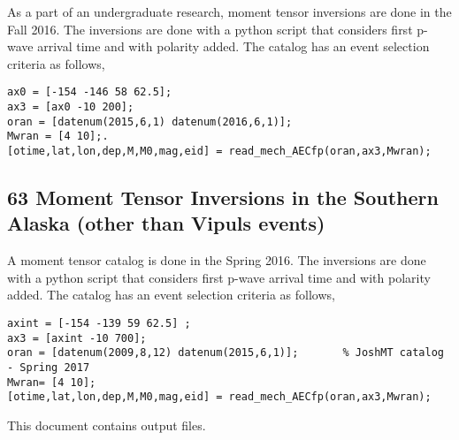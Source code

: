 \documentclass[11pt,titlepage,fleqn]{article}
\begin{document}
As a part of an undergraduate research, moment tensor inversions are done in the Fall 2016. The inversions are done with a python script that considers first p-wave arrival time and with polarity added. The catalog has an event selection criteria as follows,  
\begin{verbatim}
ax0 = [-154 -146 58 62.5];   
ax3 = [ax0 -10 200];   
oran = [datenum(2015,6,1) datenum(2016,6,1)];  
Mwran = [4 10];.
[otime,lat,lon,dep,M,M0,mag,eid] = read_mech_AECfp(oran,ax3,Mwran);
\end{verbatim}

\vspace{5mm} %

\subsection*{63  Moment Tensor Inversions in the Southern Alaska (other than Vipuls events)}
A moment tensor catalog is done in the Spring 2016. The inversions are done with a python script that considers first p-wave arrival time and with polarity added. The catalog has an event selection criteria as follows,  


\begin{verbatim}
axint = [-154 -139 59 62.5] ;  
ax3 = [axint -10 700];
oran = [datenum(2009,8,12) datenum(2015,6,1)];       % JoshMT catalog - Spring 2017
Mwran= [4 10];
[otime,lat,lon,dep,M,M0,mag,eid] = read_mech_AECfp(oran,ax3,Mwran);
\end{verbatim}



\vspace{10mm} %



This document contains output files.
\end{document}
